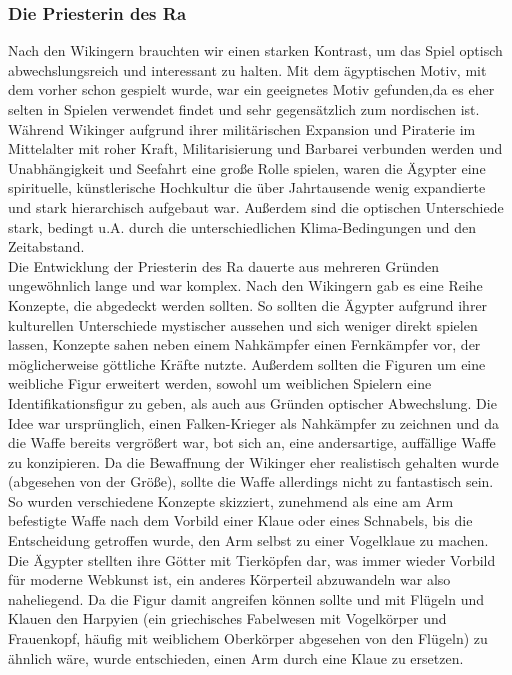 \documentclass[extern,palatino]{cgBA}
\begin{document}
\subsubsection{Die Priesterin des Ra}
Nach den Wikingern brauchten wir einen starken Kontrast, um das Spiel optisch abwechslungsreich und interessant zu halten. Mit dem ägyptischen Motiv, mit dem vorher schon gespielt wurde, war ein geeignetes Motiv gefunden,da es eher selten in Spielen verwendet findet und sehr gegensätzlich zum nordischen ist. Während Wikinger aufgrund ihrer militärischen Expansion und Piraterie im Mittelalter mit roher Kraft, Militarisierung und Barbarei verbunden werden und Unabhängigkeit und Seefahrt eine große Rolle spielen, waren die Ägypter eine spirituelle, künstlerische Hochkultur die über Jahrtausende wenig expandierte und stark hierarchisch aufgebaut war. Außerdem sind die optischen Unterschiede stark, bedingt u.A. durch die unterschiedlichen Klima-Bedingungen und den Zeitabstand. 
\\Die Entwicklung der Priesterin des Ra dauerte aus mehreren Gründen ungewöhnlich lange und war komplex.
Nach den Wikingern gab es eine Reihe Konzepte, die abgedeckt werden sollten. So sollten die Ägypter aufgrund ihrer kulturellen Unterschiede mystischer aussehen und sich weniger direkt spielen lassen, Konzepte sahen neben einem Nahkämpfer einen Fernkämpfer vor, der möglicherweise göttliche Kräfte nutzte. Außerdem sollten die Figuren um eine weibliche Figur erweitert werden, sowohl um weiblichen Spielern eine Identifikationsfigur zu geben, als auch aus Gründen optischer Abwechslung. Die Idee war ursprünglich, einen Falken-Krieger als Nahkämpfer zu zeichnen und da die Waffe bereits vergrößert war, bot sich an, eine andersartige, auffällige Waffe zu konzipieren. Da die Bewaffnung der Wikinger eher realistisch gehalten wurde (abgesehen von der Größe), sollte die Waffe allerdings nicht zu fantastisch sein. So wurden verschiedene Konzepte skizziert, zunehmend als eine am Arm befestigte Waffe nach dem Vorbild einer Klaue oder eines Schnabels, bis die Entscheidung getroffen wurde, den Arm selbst zu einer Vogelklaue zu machen. Die Ägypter stellten ihre Götter mit Tierköpfen dar, was immer wieder Vorbild für moderne Webkunst ist, ein anderes Körperteil abzuwandeln war also naheliegend. Da die Figur damit angreifen können sollte und mit Flügeln und Klauen den Harpyien (ein griechisches Fabelwesen mit Vogelkörper und Frauenkopf, häufig mit weiblichem Oberkörper abgesehen von den Flügeln) zu ähnlich wäre, wurde entschieden, einen Arm durch eine Klaue zu ersetzen.
\end{document}
